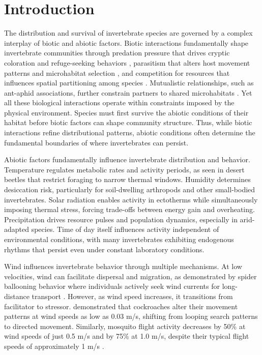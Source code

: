 \usepackage{hyperref}
\usepackage{longtable}

\chapter{Introduction}
\label{ch:introduction}

The distribution and survival of invertebrate species are governed by a complex interplay of biotic and abiotic factors. Biotic interactions fundamentally shape invertebrate communities through predation pressure that drives cryptic coloration and refuge-seeking behaviors \citep{blois-heulinDirectIndirectEffects1990; holomuzkiBioticInteractionsFreshwater2010}, parasitism that alters host movement patterns and microhabitat selection \citep{jollesSchistocephalusParasiteInfection2020; laffertyComparingMechanismsHost2013; poulinMetaanalysisParasiteinducedBehavioural1994}, and competition for resources that influences spatial partitioning among species \citep{wertheimSpeciesDiversityMycophagous2000}. Mutualistic relationships, such as ant-aphid associations, further constrain partners to shared microhabitats \citep{wayMutualismAntsHoneydewProducing1963; yaoCostsConstraintsAphidant2014}.
Yet all these biological interactions operate within constraints imposed by the physical environment. Species must first survive the abiotic conditions of their habitat before biotic factors can shape community structure. Thus, while biotic interactions refine distributional patterns, abiotic conditions often determine the fundamental boundaries of where invertebrates can persist.

Abiotic factors fundamentally influence invertebrate distribution and behavior. Temperature regulates metabolic rates and activity periods, as seen in desert beetles that restrict foraging to narrow thermal windows. Humidity determines desiccation risk, particularly for soil-dwelling arthropods and other small-bodied invertebrates. Solar radiation enables activity in ectotherms while simultaneously imposing thermal stress, forcing trade-offs between energy gain and overheating. Precipitation drives resource pulses and population dynamics, especially in arid-adapted species. Time of day itself influences activity independent of environmental conditions, with many invertebrates exhibiting endogenous rhythms that persist even under constant laboratory conditions.

Wind influences invertebrate behavior through multiple mechanisms. At low velocities, wind can facilitate dispersal and migration, as demonstrated by spider ballooning behavior where individuals actively seek wind currents for long-distance transport \citep{bonteHeritabilitySpiderBallooning2007}. However, as wind speed increases, it transitions from facilitator to stressor. \citet{bellSearchAnemotacticOrientation1979} demonstrated that cockroaches alter their movement patterns at wind speeds as low as 0.03 m/s, shifting from looping search patterns to directed movement. Similarly, mosquito flight activity decreases by 50\% at wind speeds of just 0.5 m/s and by 75\% at 1.0 m/s, despite their typical flight speeds of approximately 1 m/s \citep{bidlingmayerEffectWindVelocity1995}.

